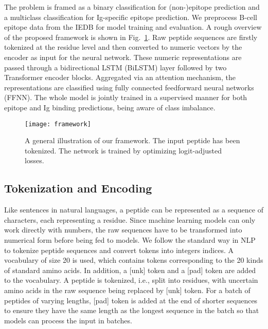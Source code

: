 \documentclass[runningheads]{llncs}
\begin{document}
The problem is framed as a binary classification for (non-)epitope prediction and a multiclass classification for Ig-specific epitope prediction. We preprocess B-cell epitope data from the IEDB for model training and evaluation. A rough overview of the proposed framework is shown in Fig.~\ref{fig1}. Raw peptide sequences are firstly tokenized at the residue level and then converted to numeric vectors by the encoder as input for the neural network. These numeric representations are passed through a bidirectional LSTM (BiLSTM) layer followed by two Transformer encoder blocks. Aggregated via an attention mechanism, the representations are classified using fully connected feedforward neural networks (FFNN). The whole model is jointly trained in a supervised manner for both epitope and Ig binding predictions, being aware of class imbalance.
\begin{figure}[htbp]
\centerline{\texttt{[image: framework]}}
\caption{A general illustration of our framework. The input peptide has been tokenized. The network is trained by optimizing logit-adjusted losses.}
\label{fig1}
\end{figure}

\subsection{Tokenization and Encoding}
Like sentences in natural languages, a peptide can be represented as a sequence of characters, each representing a residue. Since machine learning models can only work directly with numbers, the raw sequences have to be transformed into numerical form before being fed to models. We follow the standard way in NLP to tokenize peptide sequences and convert tokens into integers indices. A vocabulary of size 20 is used, which contains tokens corresponding to the 20 kinds of standard amino acids. In addition, a [unk] token and a [pad] token are added to the vocabulary. A peptide is tokenized, i.e., split into residues, with uncertain amino acids in the raw sequence being replaced by [unk] token. For a batch of peptides of varying lengths, [pad] token is added at the end of shorter sequences to ensure they have the same length as the longest sequence in the batch so that models can process the input in batches.
\end{document}
